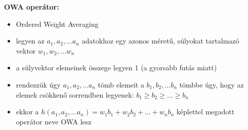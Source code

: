 \textbf{OWA operátor:}
\begin{itemize}
    \item Ordered Weight Averaging
    \item legyen az $a_1, a_2, \dots a_n$ adatokhoz egy azonos méretű, súlyokat tartalmazó vektor $w_1, w_2, \dots w_n$
    \item a súlyvektor elemeinek összege legyen 1 (a gyorsabb futás miatt)
    \item rendezzük úgy $a_1, a_2, \dots a_n$ tömb elemeit a $b_1, b_2, \dots b_n$ tömbbe úgy, hogy az elemek csökkenő sorrendben legyenek: $b_1 \ge b_2 \ge \dots \ge b_n$
    \item ekkor a $h(a_1, a_2, \dots a_n) = w_1 b_1 + w_2 b_2 + \dots + w_n b_n$ képlettel megadott operátor neve OWA lesz
\end{itemize}